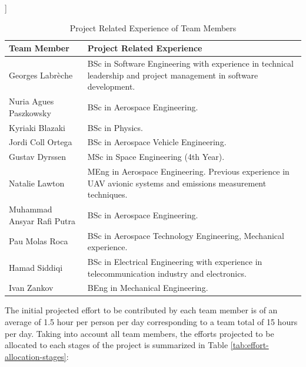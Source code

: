 ]\documentclass[a4paper,12pt,twoside]{article}
\begin{document}
\begin{table}[H]
\centering
\begin{tabular}{|l|m{11cm}|}
\hline
\textbf{Team Member} & \textbf{Project Related Experience} \\ \hline
Georges Labrèche & BSc in Software Engineering with experience in technical leadership and project management in software development.\\ \hline
Nuria Agues Paszkowsky & BSc in Aerospace Engineering.\\ \hline
Kyriaki Blazaki & BSc in Physics. \\ \hline
Jordi Coll Ortega &  BSc in Aerospace Vehicle Engineering. \\ \hline
Gustav Dyrssen &  MSc in Space Engineering (4th Year).\\ \hline
Natalie Lawton & MEng in Aerospace Engineering. Previous experience in UAV avionic systems and emissions measurement techniques. \\ \hline
Muhammad Ansyar Rafi Putra & BSc in Aerospace Engineering. \\ \hline
Pau Molas Roca & BSc in Aerospace Technology Engineering, Mechanical experience. \\ \hline
Hamad Siddiqi & BSc in Electrical Engineering with experience in telecommunication industry and electronics.  \\ \hline
Ivan Zankov & BEng in Mechanical Engineering.\\ \hline
\end{tabular}
\caption{Project Related Experience of Team Members}
\label{tab:team-member-experience}
\end{table}
\raggedbottom

The initial projected effort to be contributed by each team member is of an average of 1.5 hour per person per day corresponding to a team total of 15 hours per day. Taking into account all team members, the efforts projected to be allocated to each stages of the project is summarized in Table \ref{tab:effort-allocation-stages}:
\end{document}
